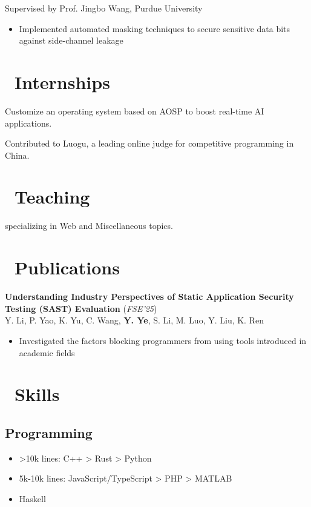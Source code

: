 \documentclass{resume}
\begin{document}
Supervised by Prof. Jingbo Wang, Purdue University
\begin{itemize}[itemsep=0.5ex]  
  \item Implemented automated masking techniques to secure sensitive data bits against side-channel leakage  
\end{itemize}

\section{\faUsers\ Internships}
Customize an operating system based on AOSP to boost real-time AI applications.

Contributed to Luogu, a leading online judge for competitive programming in China.

\section{\faBook\ Teaching}
specializing in Web and Miscellaneous topics.

\section{\faBookmarkO\ Publications}

\textbf{Understanding Industry Perspectives of Static Application Security Testing (SAST) Evaluation} (\textit{FSE'25})\\
Y. Li, P. Yao, K. Yu, C. Wang, \textbf{Y. Ye}, S. Li, M. Luo, Y. Liu, K. Ren
\begin{itemize}[itemsep=0.5ex]
  \item Investigated the factors blocking programmers from using tools introduced in academic fields
\end{itemize}


\section{\faCogs\ Skills}
\subsection{\textbf{Programming}}
\begin{itemize}[itemsep=0.5ex]
  \item >10k lines: C++ > Rust > Python
  \item 5k-10k lines: JavaScript/TypeScript > PHP > MATLAB
  \item <5k lines: Java > Haskell
\end{itemize}
\end{document}
